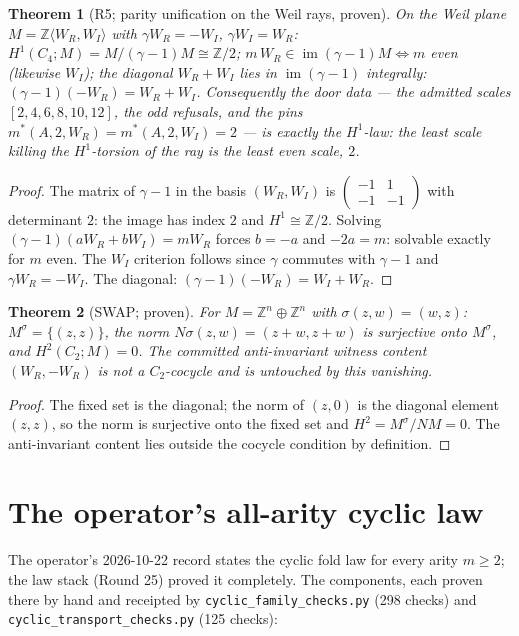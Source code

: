 \documentclass[11pt]{article}
\newcommand{\Img}{\operatorname{im}}
\newcommand{\Z}{\mathbb Z}
\newtheorem{theorem}{Theorem}[section]
\begin{document}
\begin{theorem}[R5; parity unification on the Weil rays, proven]\label{thm:R5}
On the Weil plane $M=\Z\langle W_R,W_I\rangle$ with $\gamma W_R=-W_I$,
$\gamma W_I=W_R$:
$H^1(C_4;M)=M/(\gamma-1)M\cong\Z/2$;
$m\,W_R\in\Img(\gamma-1)M\iff m$ even (likewise $W_I$);
the diagonal $W_R+W_I$ lies in $\Img(\gamma-1)$ integrally:
$(\gamma-1)(-W_R)=W_R+W_I$.
Consequently the door data --- the admitted scales $[2,4,6,8,10,12]$, the
odd refusals, and the pins $m^\ast(A,2,W_R)=m^\ast(A,2,W_I)=2$ --- is
exactly the $H^1$-law: the least scale killing the $H^1$-torsion of the ray
is the least even scale, $2$.
\end{theorem}

\begin{proof}
The matrix of $\gamma-1$ in the basis $(W_R,W_I)$ is
$\left(\begin{smallmatrix}-1&1\\-1&-1\end{smallmatrix}\right)$ with
determinant $2$: the image has index $2$ and $H^1\cong\Z/2$. Solving
$(\gamma-1)(aW_R+bW_I)=mW_R$ forces $b=-a$ and $-2a=m$: solvable exactly
for $m$ even. The $W_I$ criterion follows since $\gamma$ commutes with
$\gamma-1$ and $\gamma W_R=-W_I$. The diagonal:
$(\gamma-1)(-W_R)=W_I+W_R$.
\end{proof}

\begin{theorem}[SWAP; proven]
For $M=\Z^n\oplus\Z^n$ with $\sigma(z,w)=(w,z)$:
$M^\sigma=\{(z,z)\}$, the norm $N\sigma(z,w)=(z+w,z+w)$ is surjective onto
$M^\sigma$, and $H^2(C_2;M)=0$. The committed anti-invariant witness content
$(W_R,-W_R)$ is not a $C_2$-cocycle and is untouched by this vanishing.
\end{theorem}

\begin{proof}
The fixed set is the diagonal; the norm of $(z,0)$ is the diagonal element
$(z,z)$, so the norm is surjective onto the fixed set and
$H^2=M^\sigma/NM=0$. The anti-invariant content lies outside the cocycle
condition by definition.
\end{proof}

\section{The operator's all-arity cyclic law}\label{sec:arity}

The operator's 2026-10-22 record states the cyclic fold law for every arity
$m\ge2$; the law stack (Round 25) proved it completely. The components,
each proven there by hand and receipted by
\texttt{cyclic\_family\_checks.py} (298 checks) and
\texttt{cyclic\_transport\_checks.py} (125 checks):
\end{document}
